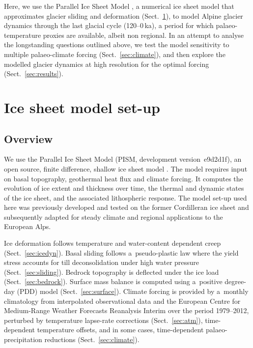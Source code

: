 \documentclass[tc, manuscript]{copernicus}
\begin{document}
    Here, we use the Parallel Ice Sheet Model
    \citep[PISM,][]{PISM-authors.2017}, a numerical ice sheet model that
    approximates glacier sliding and deformation (Sect.~\ref{sec:model}), to
    model Alpine glacier dynamics through the last glacial cycle (120--0\,ka),
    a period for which palaeo-temperature proxies are available, albeit non
    regional. In an attempt to analyse the longstanding questions outlined
    above, we test the model sensitivity to multiple palaeo-climate forcing
    (Sect.~\ref{sec:climate}), and then explore the modelled glacier dynamics
    at high resolution for the optimal forcing (Sect.~\ref{sec:results}).


\section{Ice sheet model set-up}
\label{sec:model}

\subsection{Overview}
\label{sec:overview}

    We use the Parallel Ice Sheet Model (PISM, development version~e9d2d1f), an
    open source, finite difference, shallow ice sheet model
    \citep{PISM-authors.2017}. The model requires input on basal
    topography, geothermal heat flux and climate forcing. It computes the
    evolution of ice extent and thickness over time, the thermal and dynamic
    states of the ice sheet, and the associated lithospheric response. The
    model set-up used here was previously developed and tested on the former
    Cordilleran ice sheet \citep{Seguinot.2014, Seguinot.etal.2014,
    Seguinot.etal.2016} and subsequently adapted for steady climate
    \citep{Becker.etal.2016} and regional \citep{Jouvet.etal.2017a,
    Cohen.etal.2017} applications to the European Alps.

    Ice deformation follows temperature and water-content dependent creep
    (Sect.~\ref{sec:icedyn}). Basal sliding follows a~pseudo-plastic law where
    the yield stress accounts for till deconsolidation under high water
    pressure (Sect.~\ref{sec:sliding}). Bedrock topography is deflected
    under the ice load (Sect.~\ref{sec:bedrock}). Surface mass balance is
    computed using a~positive degree-day (PDD) model (Sect.~\ref{sec:surface}).
    Climate forcing is provided by a~monthly climatology from interpolated
    observational data \citep[WorldClim;][]{Hijmans.etal.2005} and the European
    Centre for Medium-Range Weather Forecasts Reanalysis Interim
    \citep[ERA-Interim;][]{Dee.etal.2011} over the period 1979--2012,
    perturbed by temperature lapse-rate
    corrections (Sect.~\ref{sec:atm}), time-dependent temperature offsets, and
    in some cases, time-dependent palaeo-precipitation reductions
    (Sect.~\ref{sec:climate}).
\end{document}
